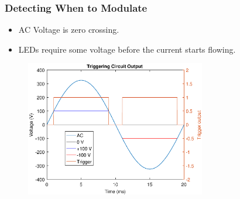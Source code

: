 \documentclass{beamer}
\begin{document}


	\begin{frame}\frametitle{Detecting When to Modulate}
		\begin{itemize}
			\item AC Voltage is zero crossing.
			\item LEDs require some voltage before the current starts flowing.
		\end{itemize}
		
		\begin{figure}
			\centering
			\includegraphics[width=0.7\textwidth]{ac-wave-triggering.eps}
		\end{figure}
		
	\end{frame}


\end{document}
